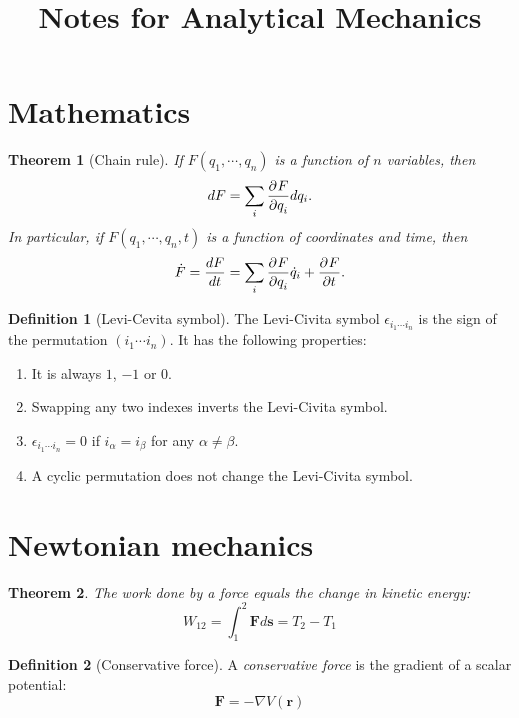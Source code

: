 \documentclass[]{article}
\title{Notes for Analytical Mechanics}
\newtheorem{theorem}{Theorem}
\theoremstyle{definition}
\newtheorem{definition}{Definition}
\begin{document}
\maketitle

\section{Mathematics}
\begin{theorem}[Chain rule] If $F(q_1, \cdots, q_n)$ is a function of $n$ variables, then
	\begin{equation*}
		dF = \sum_i \frac{\partial^{} F}{\partial q_i ^{}} dq_i.
	\end{equation*} 
In particular, if $F(q_1, \cdots, q_n, t)$ is a function of coordinates and time, then
\begin{equation*}
	\dot F = \frac{dF}{dt} =  \sum_i \frac{\partial^{} F}{\partial q_i ^{}} \dot q_i + \frac{\partial^{} F}{\partial t ^{}}.
\end{equation*}
\end{theorem}

\begin{definition}[Levi-Cevita symbol]
	The Levi-Civita symbol $\epsilon_{i_1 \cdots i_n}$ is the sign of the permutation $({i_1 \cdots i_n})$.
	It has the following properties:
	\begin{enumerate}
		\item It is always $1$, $-1$ or $0$.
		\item Swapping any two indexes inverts the Levi-Civita symbol.
		\item $\epsilon_{i_1 \cdots i_n} = 0$ if $i_\alpha = i_\beta$ for any $\alpha \neq \beta$.
		\item A cyclic permutation does not change the Levi-Civita symbol.
	\end{enumerate}
\end{definition}

\section{Newtonian mechanics}
\begin{theorem}
	The work done by a force equals the change in kinetic energy:
	\begin{equation*}
		W_12 = \int_1^2 \mathbf{F} d\mathbf{s} = T_2 - T_1
	\end{equation*}
\end{theorem}

\begin{definition}[Conservative force]
	A \emph{conservative force} is the gradient of a scalar potential:
	\begin{equation*}
		\mathbf{F} = -\nabla V(\mathbf{r})
	\end{equation*}
\end{definition}
\end{document}
